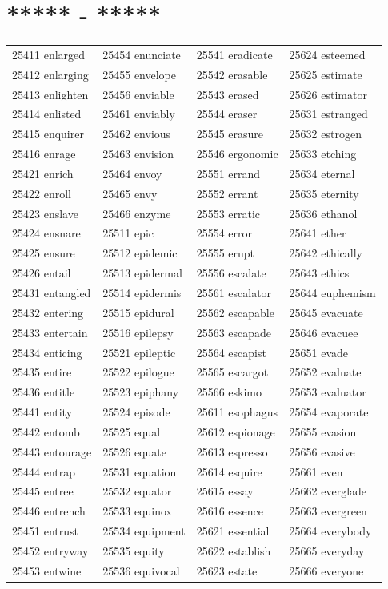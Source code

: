 \documentclass[10pt, oneside]{book}
\begin{document}
\begin{table}
	\centering
	\section*{***** - *****}
	\begin{tabular}{l l l l}
25411 enlarged &25454 enunciate &25541 eradicate &25624 esteemed\\
25412 enlarging &25455 envelope &25542 erasable &25625 estimate\\
25413 enlighten &25456 enviable &25543 erased &25626 estimator\\
25414 enlisted &25461 enviably &25544 eraser &25631 estranged\\
25415 enquirer &25462 envious &25545 erasure &25632 estrogen\\
25416 enrage &25463 envision &25546 ergonomic &25633 etching\\
25421 enrich &25464 envoy &25551 errand &25634 eternal\\
25422 enroll &25465 envy &25552 errant &25635 eternity\\
25423 enslave &25466 enzyme &25553 erratic &25636 ethanol\\
25424 ensnare &25511 epic &25554 error &25641 ether\\
25425 ensure &25512 epidemic &25555 erupt &25642 ethically\\
25426 entail &25513 epidermal &25556 escalate &25643 ethics\\
25431 entangled &25514 epidermis &25561 escalator &25644 euphemism\\
25432 entering &25515 epidural &25562 escapable &25645 evacuate\\
25433 entertain &25516 epilepsy &25563 escapade &25646 evacuee\\
25434 enticing &25521 epileptic &25564 escapist &25651 evade\\
25435 entire &25522 epilogue &25565 escargot &25652 evaluate\\
25436 entitle &25523 epiphany &25566 eskimo &25653 evaluator\\
25441 entity &25524 episode &25611 esophagus &25654 evaporate\\
25442 entomb &25525 equal &25612 espionage &25655 evasion\\
25443 entourage &25526 equate &25613 espresso &25656 evasive\\
25444 entrap &25531 equation &25614 esquire &25661 even\\
25445 entree &25532 equator &25615 essay &25662 everglade\\
25446 entrench &25533 equinox &25616 essence &25663 evergreen\\
25451 entrust &25534 equipment &25621 essential &25664 everybody\\
25452 entryway &25535 equity &25622 establish &25665 everyday\\
25453 entwine &25536 equivocal &25623 estate &25666 everyone\\
	\end{tabular}
 \end{table}
\end{document}
